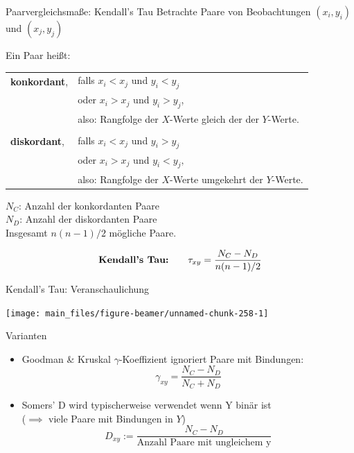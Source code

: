 \documentclass[
  10pt,
  ignorenonframetext,
]{beamer}
\providecommand{\tightlist}{%
  \setlength{\itemsep}{0pt}\setlength{\parskip}{0pt}}
\begin{document}
\begin{frame}{Paarvergleichsmaße: Kendall's Tau}
\label{paarvergleichsmauxdfe-kendalls-tau}
Betrachte Paare von Beobachtungen \((x_i, y_i)\) und \((x_j, y_j)\)

Ein Paar heißt:

\begin{tabular}{ll}
\textbf{konkordant}, & falls $x_i < x_j$ und $y_i < y_j$ \\
& oder $x_i > x_j$ und $y_i > y_j$,\\
& also: Rangfolge der $X$-Werte gleich der der $Y$-Werte.\\
&\\
\textbf{diskordant}, & falls $x_i < x_j$ und $y_i > y_j$\\
& oder $x_i > x_j$ und $y_i < y_j,$\\
& also: Rangfolge der $X$-Werte umgekehrt der $Y$-Werte.\\
\end{tabular}

\(N_C\): Anzahl der konkordanten Paare\\
\(N_D\): Anzahl der diskordanten Paare\\
Insgesamt \(n(n-1)/2\) mögliche Paare.

\begin{equation*}
\text{\textbf{Kendall's Tau:}} \qquad  \tau_{xy} = \frac{N_C - N_D}{n(n-1)/2} 
\end{equation*}
\end{frame}

\begin{frame}{Kendall's Tau: Veranschaulichung}
\label{kendalls-tau-veranschaulichung}
\scriptsize

\begin{center}\texttt{[image: main\_files/figure-beamer/unnamed-chunk-258-1]} \end{center}

\normalsize
\end{frame}

\begin{frame}{Varianten}
\label{varianten}
\begin{itemize}
\tightlist
\item
  Goodman \& Kruskal \(\gamma\)-Koeffizient ignoriert Paare mit
  Bindungen: \begin{equation*}
  \gamma_{xy} = \frac{N_C - N_D}{N_C + N_D}
  \end{equation*}
\item
  Somers' D wird typischerweise verwendet wenn Y binär ist\\
  (\(\implies\) viele Paare mit Bindungen in \(Y\))\\
  \begin{equation*}
  D_{xy}:= \frac{N_C - N_D}{\mbox{Anzahl Paare mit ungleichem y}}
  \end{equation*}
\end{itemize}
\end{frame}
\end{document}
